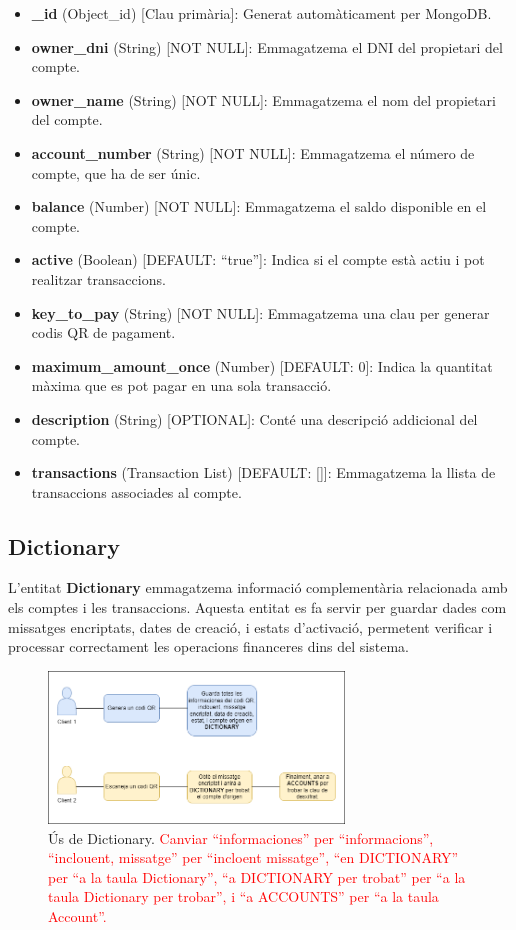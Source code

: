 \documentclass[a4paper,12pt,twoside]{ThesisStyle}
\newcommand{\pau}[1]{\textcolor{red}{#1}}
\begin{document}
\begin{itemize}
    \item \textbf{\_id} (Object\_id) [Clau primària]: Generat automàticament per MongoDB.
    \item \textbf{owner\_dni} (String) [NOT NULL]: Emmagatzema el DNI del propietari del compte.
    \item \textbf{owner\_name} (String) [NOT NULL]: Emmagatzema el nom del propietari del compte.
    \item \textbf{account\_number} (String) [NOT NULL]: Emmagatzema el número de compte, que ha de ser únic.
    \item \textbf{balance} (Number) [NOT NULL]: Emmagatzema el saldo disponible en el compte.
    \item \textbf{active} (Boolean) [DEFAULT: ``true'']: Indica si el compte està actiu i pot realitzar transaccions.
    \item \textbf{key\_to\_pay} (String) [NOT NULL]: Emmagatzema una clau per generar codis QR de pagament.
    \item \textbf{maximum\_amount\_once} (Number) [DEFAULT: 0]: Indica la quantitat màxima que es pot pagar en una sola transacció.
    \item \textbf{description} (String) [OPTIONAL]: Conté una descripció addicional del compte.
    \item \textbf{transactions} (Transaction List) [DEFAULT: []]: Emmagatzema la llista de transaccions associades al compte.
\end{itemize}




\subsection{Dictionary}
\label{subsec: Dictionary}

L'entitat \textbf{Dictionary} emmagatzema informació complementària relacionada amb els comptes i les transaccions. Aquesta entitat es fa servir per guardar dades com missatges encriptats, dates de creació, i estats d'activació, permetent verificar i processar correctament les operacions financeres dins del sistema.\\


\begin{figure}[h]
    \centering
    \includegraphics[width=0.7\textwidth]{imatges/dictionary.png}
    \caption{Ús de Dictionary. \pau{Canviar ``informaciones'' per ``informacions'', ``inclouent, missatge'' per ``incloent missatge'', ``en DICTIONARY'' per ``a la taula Dictionary'', ``a DICTIONARY per trobat'' per ``a la taula Dictionary per trobar'', i ``a ACCOUNTS'' per ``a la taula Account''.}}
    \label{fig: Ús de Dictionary}
\end{figure}
\end{document}

